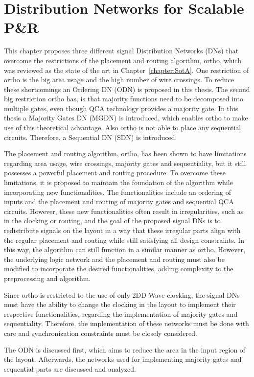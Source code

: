 \chapter{Distribution Networks for Scalable P\&R}\label{chapter:Methodology}
This chapter proposes three different signal Distribution Networks (DNs) that overcome the restrictions of the placement and routing algorithm, ortho, which was reviewed as the state of the art in Chapter~\ref{chapter:SotA}. One restriction of ortho is the big area usage and the high number of wire crossings. To reduce these shortcomings an Ordering DN (ODN) is proposed in this thesis. The second big restriction ortho has, is that majority functions need to be decomposed into multiple gates, even though QCA technology provides a majority gate. In this thesis a Majority Gates DN (MGDN) is introduced, which enables ortho to make use of this theoretical advantage. Also ortho is not able to place any sequential circuits. Therefore, a Sequential DN (SDN) is introduced.

The placement and routing algorithm, ortho, has been shown to have limitations regarding area usage, wire crossings, majority gates and sequentiality, but it still possesses a powerful placement and routing procedure. To overcome these limitations, it is proposed to maintain the foundation of the algorithm while incorporating new functionalities. The functionalities include an ordering of inputs and the placement and routing of majority gates and sequential QCA circuits. However, these new functionalities often result in irregularities, such as in the clocking or routing, and the goal of the proposed signal DNs is to redistribute signals on the layout in a way that these irregular parts align with the regular placement and routing while still satisfying all design constraints. In this way, the algorithm can still function in a similar manner as ortho. However, the underlying logic network and the placement and routing must also be modified to incorporate the desired functionalities, adding complexity to the preprocessing and algorithm.

Since ortho is restricted to the use of only 2DD-Wave clocking, the signal DNs must have the ability to change the clocking in the layout to implement their respective functionalities, regarding the implementation of majority gates and sequentiality. Therefore, the implementation of these networks must be done with care and synchronization constraints must be closely considered.

The ODN is discussed first, which aims to reduce the area in the input region of the layout. Afterwards, the networks used for implementing majority gates and sequential parts are discussed and analyzed.

